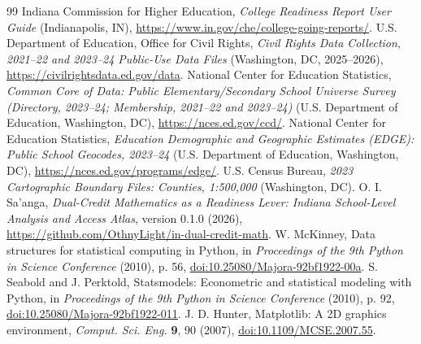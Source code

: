 \documentclass[aps,prd,reprint,superscriptaddress,nofootinbib,floatfix]{revtex4-2}
\begin{document}
\begin{thebibliography}{99}
 Indiana Commission for Higher Education, \textit{College Readiness Report User Guide} (Indianapolis, IN), \url{https://www.in.gov/che/college-going-reports/}.
 U.S. Department of Education, Office for Civil Rights, \textit{Civil Rights Data Collection, 2021--22 and 2023--24 Public-Use Data Files} (Washington, DC, 2025--2026), \url{https://civilrightsdata.ed.gov/data}.
 National Center for Education Statistics, \textit{Common Core of Data: Public Elementary/Secondary School Universe Survey (Directory, 2023--24; Membership, 2021--22 and 2023--24)} (U.S. Department of Education, Washington, DC), \url{https://nces.ed.gov/ccd/}.
 National Center for Education Statistics, \textit{Education Demographic and Geographic Estimates (EDGE): Public School Geocodes, 2023--24} (U.S. Department of Education, Washington, DC), \url{https://nces.ed.gov/programs/edge/}.
 U.S. Census Bureau, \textit{2023 Cartographic Boundary Files: Counties, 1:500,000} (Washington, DC).
 O. I. Sa'anga, \textit{Dual-Credit Mathematics as a Readiness Lever: Indiana School-Level Analysis and Access Atlas}, version 0.1.0 (2026), \url{https://github.com/OthnyLight/in-dual-credit-math}.
 W. McKinney, Data structures for statistical computing in Python, in \textit{Proceedings of the 9th Python in Science Conference} (2010), p. 56, \href{https://doi.org/10.25080/Majora-92bf1922-00a}{doi:10.25080/Majora-92bf1922-00a}.
 S. Seabold and J. Perktold, Statsmodels: Econometric and statistical modeling with Python, in \textit{Proceedings of the 9th Python in Science Conference} (2010), p. 92, \href{https://doi.org/10.25080/Majora-92bf1922-011}{doi:10.25080/Majora-92bf1922-011}.
 J. D. Hunter, Matplotlib: A 2D graphics environment, \textit{Comput. Sci. Eng.} \textbf{9}, 90 (2007), \href{https://doi.org/10.1109/MCSE.2007.55}{doi:10.1109/MCSE.2007.55}.
\end{thebibliography}
\end{document}
